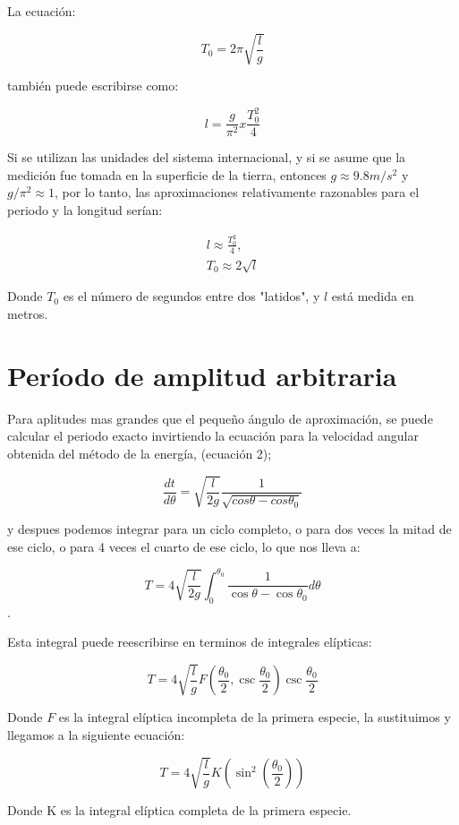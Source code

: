 \documentclass[12pt,letterpaper]{article}
\begin{document}
La ecuación: 

$$ T_0 = 2\pi \sqrt{\frac{l}{g}} $$

también puede escribirse como: 

$$ l = \frac{g}{\pi^2} x \frac{T^2_0}{4} $$

Si se utilizan las unidades del sistema internacional, y si se asume que la medición fue tomada en la superficie de la tierra, entonces $ g \approx 9.8m/s^2$ y $ g/\pi^2 \approx 1 $, por lo tanto, las aproximaciones relativamente razonables para el periodo y la longitud serían:

\begin{eqnarray}
\nonumber l \approx \frac{T^2_0}{4}, \\
\nonumber T_0 \approx 2\sqrt{l}
\end{eqnarray}

Donde $T_0$ es el número de segundos entre dos "latidos", y $ l $ está medida en metros.


\section{Período de amplitud arbitraria}

Para aplitudes mas grandes que el pequeño ángulo de aproximación, se puede calcular el periodo exacto invirtiendo la ecuación para la velocidad angular obtenida del método de la energía, (ecuación 2);

$$ \frac{dt}{d\theta} = \sqrt{\frac{l}{2g}} \frac{1}{\sqrt{cos\theta - cos\theta_0}} $$

y despues podemos integrar para un ciclo completo, o para dos veces la mitad de ese ciclo, o para 4 veces el cuarto de ese ciclo, lo que nos lleva a: 

$$ T = 4\sqrt{\frac{l}{2g}} \int_{0}^{\theta_0}\frac{1}{\cos \theta - \cos \theta_0}d\theta $$.

Esta integral puede reescribirse en terminos de integrales elípticas: 

$$ T = 4\sqrt{\frac{l}{g}} F (\frac{\theta_0}{2}, \csc\frac{\theta_0}{2})\csc\frac{\theta_0}{2} $$ 

Donde $ F $ es la integral elíptica incompleta de la primera especie, la sustituimos y llegamos a la siguiente ecuación:

\begin{equation}
T = 4\sqrt{\frac{l}{g}} K (\sin^2(\frac{\theta_0}{2}))
\end{equation}

Donde K es la integral elíptica completa de la primera especie.
\end{document}
